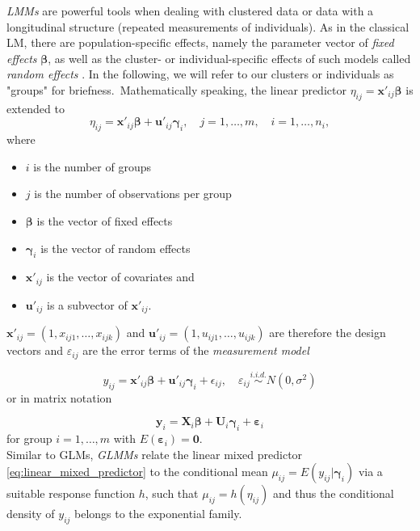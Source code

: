 \textit{\acp{LMM}} are powerful tools when dealing with clustered data or data with a longitudinal structure (repeated measurements of individuals).
As in the classical \ac{LM}, there are population-specific effects, namely the parameter vector of \textit{fixed effects} $\boldsymbol{\beta}$, as well as the cluster- or individual-specific effects of such models called \textit{random effects} \citep{fahrmeir2003regression}. In the following, we will refer to our clusters or individuals as "groups" for briefness.\ Mathematically speaking, the linear predictor $\eta_{ij}= \mathbf{x}'_{ij} \mathbf{\beta} $ is extended to
\begin{equation}
\eta_{ij} = \bm{{x'}}_{ij} \bm{\beta} + \bm{u'}_{ij}\bm{\gamma}_i, \quad j=1, \ldots, m, \quad i=1, \ldots, n_i, 
\label{eq:linear_mixed_predictor}
\end{equation}
where
\begin{itemize}
\item $i$ is the number of groups
\item $j$ is the number of observations per group
\item $\bm{\beta}$ is the vector of fixed effects
\item $\bm{\gamma}_i$ is the vector of random effects
\item $\bm{x'}_{ij}$ is the vector of covariates and
\item $\bm{u'}_{ij}$ is a subvector of $\bm{x'}_{ij}$.
\end{itemize}


$\bm{x'}_{ij} = (1, x_{ij1}, \ldots, x_{ijk}) $ and $ \bm{u'}_{ij} = (1, u_{ij1}, \ldots, u_{ijk}) $ are therefore the design vectors and $\varepsilon_{ij}$ are the error terms of the \textit{measurement model}

\begin{equation}
y_{ij} =  \bm{x'}_{ij} \bm{\beta} + \bm{u'}_{ij} \bm{\gamma}_i + \epsilon_{ij}, \quad \varepsilon_{i j} \overset{i.i.d.} \sim N\left(0, \sigma^{2}\right) 
\end{equation}
or in matrix notation

\begin{equation}
\bm{y}_{i}=\bm{X}_{i} \bm{\beta} + \bm{U}_{i} \bm{\gamma}_{i} + \bm{\varepsilon}_{i}
\end{equation}
for group $ i=1, \ldots, m $ with $ E(\bm{\varepsilon}_{i}) = \bm{0}$. \\

Similar to \acp{GLM}, \textit{\acp{GLMM}} relate the linear mixed predictor \ref{eq:linear_mixed_predictor} to the conditional mean 
$ \mu_{ij} = E(y_{ij} | \bm{\gamma}_{i}) $
via a suitable response function $h$, such that
$ \mu_{ij} = h(\eta_{ij}) $ and thus the conditional density of $y_{ij}$ belongs to the exponential family.
